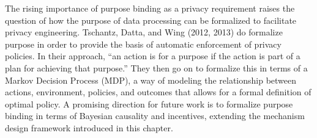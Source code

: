 \documentclass[../thesis.tex]{subfiles}
\begin{document}
The rising importance of purpose binding as a privacy requirement
raises the question of how the purpose of data processing can
be formalized to facilitate privacy engineering.
Tschantz, Datta, and Wing (2012, 2013) do formalize purpose
in order to provide the basis of
automatic enforcement of privacy policies.
In their approach, ``an action is for a purpose if the
action is part of a plan for achieving that purpose.''
They then go on to formalize this in terms of
a Markov Decision Process (MDP), a way of modeling the relationship between actions,
environment, policies, and outcomes that allows for a formal definition of optimal policy.
A promising direction for future work is to formalize
purpose binding in terms of Bayesian causality and incentives,
extending the mechanism design framework introduced in
this chapter.
\end{document}
